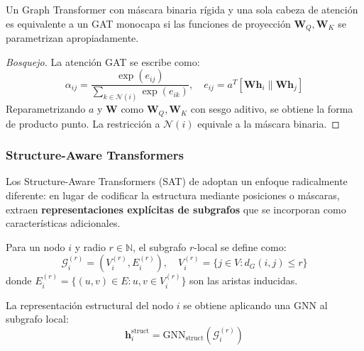 \begin{theorem}\label{thm:gat_graphtransformer_equivalence}
Un Graph \gls{Transformer} con máscara binaria rígida y una sola cabeza de atención es equivalente a un \gls{GAT} monocapa si las funciones de proyección $\mathbf{W}_Q, \mathbf{W}_K$ se parametrizan apropiadamente.
\end{theorem}

\begin{proof}[Bosquejo]
La atención \gls{GAT} se escribe como:
\begin{equation}
    \alpha_{ij} = \frac{\exp(e_{ij})}{\sum_{k \in \mathcal{N}(i)} \exp(e_{ik})}, \quad e_{ij} = a^T[\mathbf{W}\mathbf{h}_i \| \mathbf{W}\mathbf{h}_j]
\end{equation}
Reparametrizando $a$ y $\mathbf{W}$ como $\mathbf{W}_Q, \mathbf{W}_K$ con sesgo aditivo, se obtiene la forma de producto punto. La restricción a $\mathcal{N}(i)$ equivale a la máscara binaria.
\end{proof}

\subsubsection[Structure-Aware Transformers]{Structure-Aware \glspl{Transformer}}\label{subsubsec:structure_aware_transformers}

Los Structure-Aware \glspl{Transformer} (SAT) de \citet{chen2022structureaware} adoptan un enfoque radicalmente diferente: en lugar de codificar la estructura mediante posiciones o máscaras, extraen \textbf{representaciones explícitas de subgrafos} que se incorporan como características adicionales.

\begin{definition}\label{def:subgraph_representation_sat}
Para un nodo $i$ y radio $r \in \mathbb{N}$, el subgrafo $r$-local se define como:
\begin{equation}
    \mathcal{G}_i^{(r)} = (V_i^{(r)}, E_i^{(r)}), \quad V_i^{(r)} = \{j \in V : d_G(i,j) \leq r\}
    \label{eq:local_subgraph}
\end{equation}
donde $E_i^{(r)} = \{(u,v) \in E : u, v \in V_i^{(r)}\}$ son las aristas inducidas.

La representación estructural del nodo $i$ se obtiene aplicando una \gls{GNN} al subgrafo local:
\begin{equation}
    \mathbf{h}_i^{\text{struct}} = \text{GNN}_{\text{struct}}(\mathcal{G}_i^{(r)})
    \label{eq:structural_representation_sat}
\end{equation}
\end{definition}

